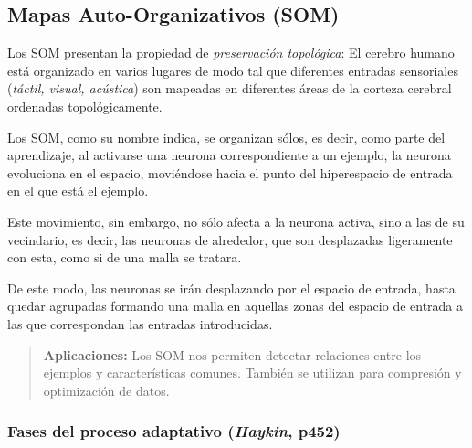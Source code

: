 \documentclass[10pt,a4paper]{article}
\begin{document}
\subsection{Mapas Auto-Organizativos (SOM)}

Los SOM presentan la propiedad de \textit{preservación topológica}: El cerebro humano está organizado en varios lugares de modo tal que diferentes entradas sensoriales (\textit{táctil, visual, acústica}) son mapeadas en diferentes áreas de la corteza cerebral ordenadas topológicamente.

Los SOM, como su nombre indica, se organizan sólos, es decir, como parte del aprendizaje, al activarse una neurona correspondiente a un ejemplo, la neurona evoluciona en el espacio, moviéndose hacia el punto del hiperespacio de entrada en el que está el ejemplo.

Este movimiento, sin embargo, no sólo afecta a la neurona activa, sino a las de su vecindario, es decir, las neuronas de alrededor, que son desplazadas ligeramente con esta, como si de una malla se tratara.

De este modo, las neuronas se irán desplazando por el espacio de entrada, hasta quedar agrupadas formando una malla en aquellas zonas del espacio de entrada a las que correspondan las entradas introducidas.

\begin{quote}
\textbf{Aplicaciones:} Los SOM nos permiten detectar relaciones entre los ejemplos y características comunes. También se utilizan para compresión y optimización de datos.
\end{quote}

\subsubsection{Fases del proceso adaptativo (\textit{Haykin}, p452)}
\end{document}
